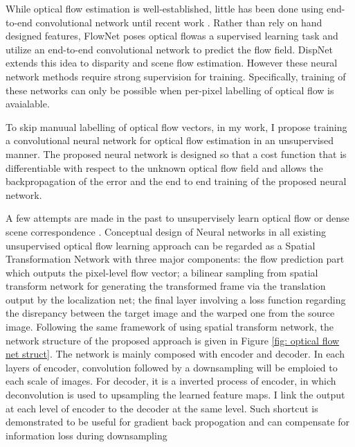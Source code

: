 \documentclass{iitthesis}
\begin{document}
While optical flow estimation is well-established, little has been done using end-to-end convolutional network until recent work \cite{7410673}\cite{Ranjan_2017_CVPR}. Rather than rely on hand designed features, FlowNet\cite{7410673} poses optical flowas a supervised learning task and utilize an end-to-end convolutional network to predict the flow field. DispNet \cite{mayer2016large} extends this idea to disparity and scene flow estimation. However these neural network methods require strong supervision for training. Specifically, training of these networks can only be possible when per-pixel labelling of optical flow is avaialable.

To skip manuual labelling of optical flow vectors, in my work, I propose training a convolutional neural network for optical flow estimation in an unsupervised manner. The proposed neural network is designed so that a cost function that is differentiable with respect to the unknown optical flow field and allows the backpropagation of the error and the end to end training of the proposed neural network.

A few attempts are made in the past to unsupervisely learn optical flow or dense scene correspondence \cite{ahmadi2016unsupervised}\cite{ren2017unsupervised}\cite{DBLP:journals/corr/YuHD16}. Conceptual design of Neural networks in all existing unsupervised optical flow learning approach can be regarded as a Spatial Transformation Network \cite{NIPS2015_5854} with three major components: the flow prediction part which outputs the pixel-level flow vector; a bilinear sampling from spatial transform network \cite{NIPS2015_5854} for generating the transformed frame via the translation output by the localization net; the final layer involving a loss function regarding the disrepancy between the target image and the warped one from the source image. Following the same framework of using spatial transform network, the network structure of the proposed approach is given in Figure \ref{fig: optical flow net struct}. The network is mainly composed with encoder and decoder. In each layers of encoder, convolution followed by a downsampling will be emploied to each scale of images. For decoder, it is a inverted process of encoder, in which deconvolution is used to upsampling the learned feature maps. I link the output at each level of encoder to the decoder at the same level. Such shortcut is demonstrated to be useful for gradient back propogation and can compensate for information loss during downsampling \cite{ronneberger2015u} 
\end{document}
